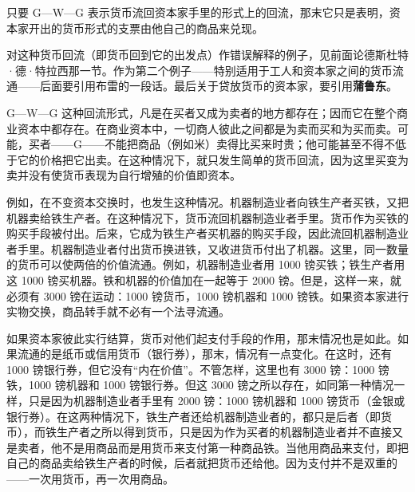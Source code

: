 只要 G—W—G 表示货币流回资本家手里的形式上的回流，那末它只是表明，资本家开出的货币形式的支票由他自己的商品来兑现。

对这种货币回流（即货币回到它的出发点）作错误解释的例子，见前面论德斯杜特·德·特拉西那一节。作为第二个例子——特别适用于工人和资本家之间的货币流通——后面要引用布雷的一段话。最后关于贷放货币的资本家，要引用\textbf{蒲鲁东}。

G—W—G 这种回流形式，凡是在买者又成为卖者的地方都存在；因而它在整个商业资本中都存在。在商业资本中，一切商人彼此之间都是为卖而买和为买而卖。可能，买者——G——不能把商品（例如米）卖得比买来时贵；他可能甚至不得不低于它的价格把它出卖。在这种情况下，就只发生简单的货币回流，因为这里买变为卖并没有使货币表现为自行增殖的价值即资本。

例如，在不变资本交换时，也发生这种情况。机器制造业者向铁生产者买铁，又把机器卖给铁生产者。在这种情况下，货币流回机器制造业者手里。货币作为买铁的购买手段被付出。后来，它成为铁生产者买机器的购买手段，因此流回机器制造业者手里。机器制造业者付出货币换进铁，又收进货币付出了机器。这里，同一数量的货币可以使两倍的价值流通。例如，机器制造业者用 1000 镑买铁；铁生产者用这 1000 镑买机器。铁和机器的价值加在一起等于 2000 镑。但是，这样一来，就必须有 3000 镑在运动：1000 镑货币，1000 镑机器和 1000 镑铁。如果资本家进行实物交换，商品转手就不必有一个法寻流通。

如果资本家彼此实行结算，货币对他们起支付手段的作用，那末情况也是如此。如果流通的是纸币或信用货币（银行券），那末，情况有一点变化。在这时，还有 1000 镑银行券，但它没有“内在价值”。不管怎样，这里也有 3000 镑：1000 镑铁，1000 镑机器和 1000 镑银行券。但这 3000 镑之所以存在，如同第一种情况一样，只是因为机器制造业者手里有 2000 镑：1000 镑机器和 1000 镑货币（金银或银行券）。在这两种情况下，铁生产者还给机器制造业者的，都只是后者（即货币），而铁生产者之所以得到货币，只是因为作为买者的机器制造业者并不直接又是卖者，他不是用商品而是用货币来支付第一种商品铁。当他用商品来支付，即把自己的商品卖给铁生产者的时候，后者就把货币还给他。因为支付并不是双重的——一次用货币，再一次用商品。

